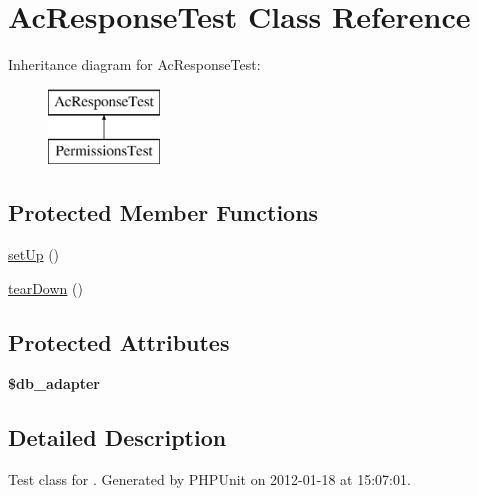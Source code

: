 \hypertarget{class_ac_response_test}{\section{\-Ac\-Response\-Test \-Class \-Reference}
\label{class_ac_response_test}
}
\-Inheritance diagram for \-Ac\-Response\-Test\-:\begin{figure}[H]
\begin{center}
\leavevmode
\includegraphics[height=2.000000cm]{class_ac_response_test}
\end{center}
\end{figure}
\subsection*{\-Protected \-Member \-Functions}
\begin{DoxyCompactItemize}
\item 
\hyperlink{class_ac_response_test_a0bc688732d2b3b162ffebaf7812e78da}{set\-Up} ()
\item 
\hyperlink{class_ac_response_test_a80fe3d17e658907fc75346a0ec9d6fc7}{tear\-Down} ()
\end{DoxyCompactItemize}
\subsection*{\-Protected \-Attributes}
\begin{DoxyCompactItemize}
\item 
\hypertarget{class_ac_response_test_a0654a20c0d3d5152146d92628efb4fb1}{{\bfseries \$db\-\_\-adapter}}\label{class_ac_response_test_a0654a20c0d3d5152146d92628efb4fb1}

\end{DoxyCompactItemize}


\subsection{\-Detailed \-Description}
\-Test class for . \-Generated by \-P\-H\-P\-Unit on 2012-\/01-\/18 at 15\-:07\-:01. 


